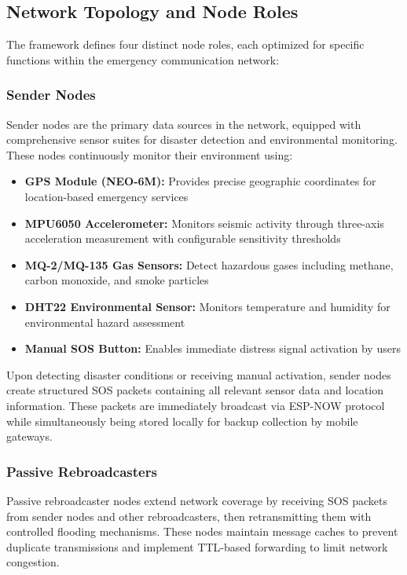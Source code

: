 \documentclass[conference]{IEEEtran}
\begin{document}
\subsection{Network Topology and Node Roles}

The framework defines four distinct node roles, each optimized for specific functions within the emergency communication network:

\subsubsection{Sender Nodes}
Sender nodes are the primary data sources in the network, equipped with comprehensive sensor suites for disaster detection and environmental monitoring. These nodes continuously monitor their environment using:

\begin{itemize}
\item \textbf{GPS Module (NEO-6M):} Provides precise geographic coordinates for location-based emergency services
\item \textbf{MPU6050 Accelerometer:} Monitors seismic activity through three-axis acceleration measurement with configurable sensitivity thresholds
\item \textbf{MQ-2/MQ-135 Gas Sensors:} Detect hazardous gases including methane, carbon monoxide, and smoke particles
\item \textbf{DHT22 Environmental Sensor:} Monitors temperature and humidity for environmental hazard assessment
\item \textbf{Manual SOS Button:} Enables immediate distress signal activation by users
\end{itemize}

Upon detecting disaster conditions or receiving manual activation, sender nodes create structured SOS packets containing all relevant sensor data and location information. These packets are immediately broadcast via ESP-NOW protocol while simultaneously being stored locally for backup collection by mobile gateways.

\subsubsection{Passive Rebroadcasters}
Passive rebroadcaster nodes extend network coverage by receiving SOS packets from sender nodes and other rebroadcasters, then retransmitting them with controlled flooding mechanisms. These nodes maintain message caches to prevent duplicate transmissions and implement TTL-based forwarding to limit network congestion.
\end{document}
